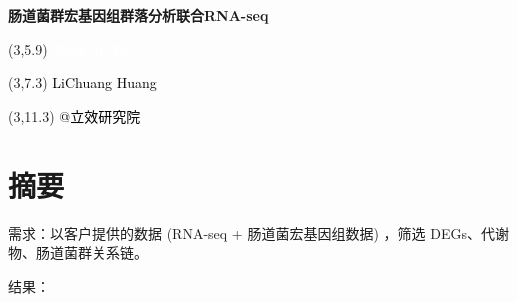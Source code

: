 \documentclass[
]{article}
\author{}
\date{\vspace{-2.5em}}
\begin{document}
\begin{titlepage} 
\begin{center} \textbf{\Huge
肠道菌群宏基因组群落分析联合RNA-seq} \vspace{4em}
\begin{textblock}{10}(3,5.9) \huge
\textbf{\textcolor{white}{2024-01-29}}
\end{textblock} \begin{textblock}{10}(3,7.3)
\Large \textcolor{black}{LiChuang Huang}
\end{textblock} \begin{textblock}{10}(3,11.3)
\Large \textcolor{black}{@立效研究院}
\end{textblock} \end{center} \end{titlepage}
\restoregeometry


\tableofcontents

\listoffigures

\listoftables

\newpage


\hypertarget{abstract}{%
\section{摘要}\label{abstract}}

需求：以客户提供的数据 (RNA-seq + 肠道菌宏基因组数据) ，筛选 DEGs、代谢物、肠道菌群关系链。

结果：
\end{document}
